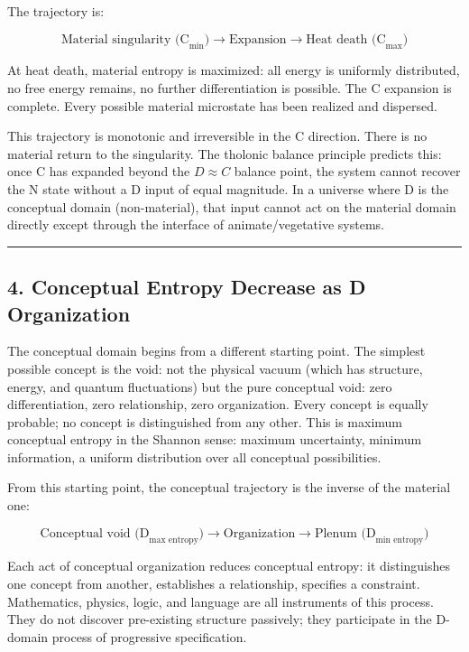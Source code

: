 \documentclass[
  11pt,
  letterpaper,
]{article}
\begin{document}
The trajectory is:

\[\text{Material singularity (C}_\text{min}\text{)} \longrightarrow \text{Expansion} \longrightarrow \text{Heat death (C}_\text{max}\text{)}\]

At heat death, material entropy is maximized: all energy is uniformly
distributed, no free energy remains, no further differentiation is
possible. The C expansion is complete. Every possible material
microstate has been realized and dispersed.

This trajectory is monotonic and irreversible in the C direction. There
is no material return to the singularity. The tholonic balance principle
predicts this: once C has expanded beyond the \(D \approx C\) balance
point, the system cannot recover the N state without a D input of equal
magnitude. In a universe where D is the conceptual domain
(non-material), that input cannot act on the material domain directly
except through the interface of animate/vegetative systems.

\begin{center}\rule{0.5\linewidth}{0.5pt}\end{center}

\subsection{4. Conceptual Entropy Decrease as D
Organization}\label{conceptual-entropy-decrease-as-d-organization}

The conceptual domain begins from a different starting point. The
simplest possible concept is the void: not the physical vacuum (which
has structure, energy, and quantum fluctuations) but the pure conceptual
void: zero differentiation, zero relationship, zero organization. Every
concept is equally probable; no concept is distinguished from any other.
This is maximum conceptual entropy in the Shannon sense: maximum
uncertainty, minimum information, a uniform distribution over all
conceptual possibilities.

From this starting point, the conceptual trajectory is the inverse of
the material one:

\[\text{Conceptual void (D}_\text{max entropy}\text{)} \longrightarrow \text{Organization} \longrightarrow \text{Plenum (D}_\text{min entropy}\text{)}\]

Each act of conceptual organization reduces conceptual entropy: it
distinguishes one concept from another, establishes a relationship,
specifies a constraint. Mathematics, physics, logic, and language are
all instruments of this process. They do not discover pre-existing
structure passively; they participate in the D-domain process of
progressive specification.
\end{document}
